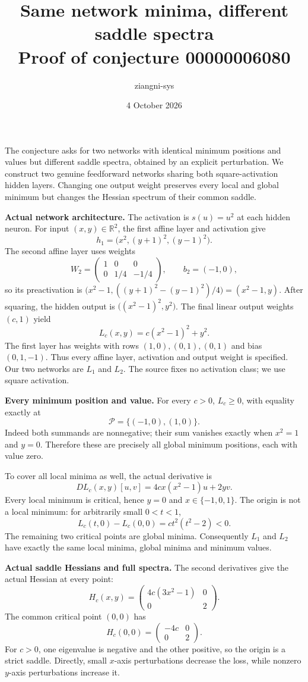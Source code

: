 \documentclass[11pt]{article}
\title{Same network minima, different saddle spectra\\
\large Proof of conjecture 00000006080}
\author{ziangni-sys}
\date{4 October 2026}
\begin{document}
\maketitle
The conjecture asks for two networks with identical minimum positions
and values but different saddle spectra, obtained by an explicit
perturbation. We construct two genuine feedforward networks sharing
both square-activation hidden layers. Changing one output weight
preserves every local and global minimum but changes the Hessian
spectrum of their common saddle.

\textbf{Actual network architecture.}
The activation is $s(u)=u^2$ at each hidden neuron.
For input $(x,y)\in\mathbb R^2$, the first affine layer and activation give
\[
 h_1=\bigl(x^2,(y+1)^2,(y-1)^2\bigr).
\]
The second affine layer uses weights
\[
 W_2=\begin{pmatrix}1&0&0\\0&1/4&-1/4\end{pmatrix},
 \qquad b_2=(-1,0),
\]
so its preactivation is
$\bigl(x^2-1,((y+1)^2-(y-1)^2)/4\bigr)=(x^2-1,y)$.
After squaring, the hidden output is
$\bigl((x^2-1)^2,y^2\bigr)$.
The final linear output weights $(c,1)$ yield
\[
 L_c(x,y)=c(x^2-1)^2+y^2.
\]
The first layer has weights with rows $(1,0),(0,1),(0,1)$
and bias $(0,1,-1)$. Thus every affine layer, activation and output
weight is specified. Our two networks are $L_1$ and $L_2$.
The source fixes no activation class; we use square activation.

\textbf{Every minimum position and value.}
For every $c>0$, $L_c\geq0$, with equality exactly at
\[
 \mathcal P=\{(-1,0),(1,0)\}.
\]
Indeed both summands are nonnegative; their sum vanishes exactly
when $x^2=1$ and $y=0$. Therefore these are precisely all global
minimum positions, each with value zero.

To cover all local minima as well, the actual derivative is
\[
 DL_c(x,y)[u,v]=4cx(x^2-1)u+2yv.
\]
Every local minimum is critical, hence $y=0$ and
$x\in\{-1,0,1\}$.
The origin is not a local minimum: for arbitrarily small
$0<t<1$,
\[
 L_c(t,0)-L_c(0,0)=ct^2(t^2-2)<0.
\]
The remaining two critical points are global minima.
Consequently $L_1$ and $L_2$ have exactly the same local minima,
global minima and minimum values.

\newpage
\textbf{Actual saddle Hessians and full spectra.}
The second derivatives give the actual Hessian at every point:
\[
 H_c(x,y)=
 \begin{pmatrix}4c(3x^2-1)&0\\0&2\end{pmatrix}.
\]
The common critical point $(0,0)$ has
\[
 H_c(0,0)=\begin{pmatrix}-4c&0\\0&2\end{pmatrix}.
\]
For $c>0$, one eigenvalue is negative and the other positive,
so the origin is a strict saddle. Directly, small $x$-axis
perturbations decrease the loss, while nonzero $y$-axis
perturbations increase it.
\end{document}
